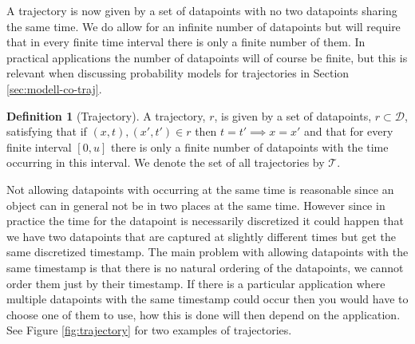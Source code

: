 \documentclass[12pt]{article}
\newcommand{\loc}{x}
\newcommand{\tim}{t}
\newcommand{\traj}{r}
\newcommand{\dataset}{\mathcal{D}}
\newcommand{\trajset}{\mathcal{T}}
\theoremstyle{definition}
\newtheorem{definition}{Definition}[section]
\begin{document}
A trajectory is now given by a set of datapoints with no two
datapoints sharing the same time. We do allow for an infinite number
of datapoints but will require that in every finite time interval
there is only a finite number of them. In practical applications the
number of datapoints will of course be finite, but this is relevant
when discussing probability models for trajectories in Section
\ref{sec:modell-co-traj}.
\begin{definition}[Trajectory]
  \label{def:trajectory}
  A trajectory, \(\traj\), is given by a set of datapoints,
  \(\traj \subset \dataset\), satisfying that if
  \((\loc, \tim), (\loc', \tim') \in \traj\) then
  \(\tim = \tim' \implies \loc = \loc'\) and that for every finite
  interval \([0, u]\) there is only a finite number of datapoints with
  the time occurring in this interval. We denote the set of all
  trajectories by \(\trajset\).
\end{definition}
Not allowing datapoints with occurring at the same time is reasonable
since an object can in general not be in two places at the same time.
However since in practice the time for the datapoint is necessarily
discretized it could happen that we have two datapoints that are
captured at slightly different times but get the same discretized
timestamp. The main problem with allowing datapoints with the same
timestamp is that there is no natural ordering of the datapoints, we
cannot order them just by their timestamp. If there is a particular
application where multiple datapoints with the same timestamp could
occur then you would have to choose one of them to use, how this is
done will then depend on the application. See Figure
\ref{fig:trajectory} for two examples of trajectories.
\end{document}
